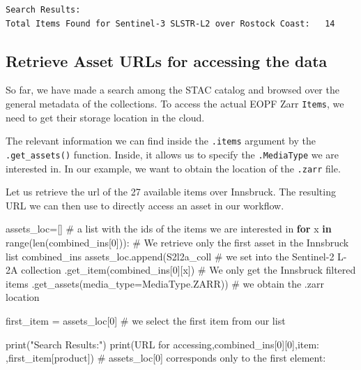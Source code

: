 \documentclass[
  letterpaper,
  DIV=11,
  numbers=noendperiod]{scrreprt}
\newenvironment{Shaded}{\begin{snugshade}}{\end{snugshade}}
\newcommand{\BuiltInTok}[1]{\textcolor[rgb]{0.00,0.23,0.31}{#1}}
\newcommand{\CommentTok}[1]{\textcolor[rgb]{0.37,0.37,0.37}{#1}}
\newcommand{\ControlFlowTok}[1]{\textcolor[rgb]{0.00,0.23,0.31}{\textbf{#1}}}
\newcommand{\DecValTok}[1]{\textcolor[rgb]{0.68,0.00,0.00}{#1}}
\newcommand{\KeywordTok}[1]{\textcolor[rgb]{0.00,0.23,0.31}{\textbf{#1}}}
\newcommand{\NormalTok}[1]{\textcolor[rgb]{0.00,0.23,0.31}{#1}}
\newcommand{\OperatorTok}[1]{\textcolor[rgb]{0.37,0.37,0.37}{#1}}
\newcommand{\StringTok}[1]{\textcolor[rgb]{0.13,0.47,0.30}{#1}}
\begin{document}
\begin{verbatim}
Search Results:
Total Items Found for Sentinel-3 SLSTR-L2 over Rostock Coast:   14
\end{verbatim}

\subsection{Retrieve Asset URLs for accessing the
data}\label{retrieve-asset-urls-for-accessing-the-data}

So far, we have made a search among the STAC catalog and browsed over
the general metadata of the collections. To access the actual EOPF Zarr
\texttt{Items}, we need to get their storage location in the cloud.

The relevant information we can find inside the \texttt{.items} argument
by the \texttt{.get\_assets()} function. Inside, it allows us to specify
the \texttt{.MediaType} we are interested in. In our example, we want to
obtain the location of the \texttt{.zarr} file.

Let us retrieve the url of the 27 available items over Innsbruck. The
resulting URL we can then use to directly access an asset in our
workflow.

\begin{Shaded}
\begin{Highlighting}[]
\NormalTok{assets\_loc}\OperatorTok{=}\NormalTok{[] }\CommentTok{\# a list with the ids of the items we are interested in}
\ControlFlowTok{for}\NormalTok{ x }\KeywordTok{in} \BuiltInTok{range}\NormalTok{(}\BuiltInTok{len}\NormalTok{(combined\_ins[}\DecValTok{0}\NormalTok{])): }\CommentTok{\# We retrieve only the first asset in the Innsbruck list combined\_ins}
\NormalTok{    assets\_loc.append(S2l2a\_coll }\CommentTok{\# we set into the Sentinel{-}2 L{-}2A collection}
\NormalTok{                      .get\_item(combined\_ins[}\DecValTok{0}\NormalTok{][x])  }\CommentTok{\# We only get the Innsbruck filtered items}
\NormalTok{                      .get\_assets(media\_type}\OperatorTok{=}\NormalTok{MediaType.ZARR)) }\CommentTok{\# we obtain the .zarr location}
    
\NormalTok{first\_item }\OperatorTok{=}\NormalTok{ assets\_loc[}\DecValTok{0}\NormalTok{]   }\CommentTok{\# we select the first item from our list}

\BuiltInTok{print}\NormalTok{(}\StringTok{"Search Results:"}\NormalTok{)}
\BuiltInTok{print}\NormalTok{(}\StringTok{\textquotesingle{}URL for accessing\textquotesingle{}}\NormalTok{,combined\_ins[}\DecValTok{0}\NormalTok{][}\DecValTok{0}\NormalTok{],}\StringTok{\textquotesingle{}item:  \textquotesingle{}}\NormalTok{,first\_item[}\StringTok{\textquotesingle{}product\textquotesingle{}}\NormalTok{]) }\CommentTok{\# assets\_loc[0] corresponds only to the first element:}
\end{Highlighting}
\end{Shaded}
\end{document}
